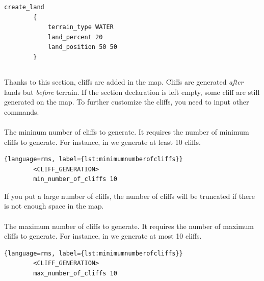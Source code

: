     \begin{lstlisting}[language=rms,label={lst:create-land},caption={Example of usage of \term{create\_land} in Team Arean by vierklee.}]
        create_land
        { 
            terrain_type WATER
            land_percent 20
            land_position 50 50
        }
    \end{lstlisting}

    \subsection{}

    Thanks to this section, cliffs are added in the map\cite{aok:cliffs, zetnus:2015}.
    Cliffs are generated \textit{after} lands but \textit{before} terrain. If the section declaration is left empty, some cliff are still generated on the map.
    To further customize the cliffs, you need to input other commands.

    \paragraph{}

    The mininum number of cliffs to generate. It requires the number of minimum cliffs to generate. For instance, in  we generate at least 10 cliffs.

    \begin{lstlisting}{language=rms, label={lst:minimumnumberofcliffs}}
        <CLIFF_GENERATION>
        min_number_of_cliffs 10
    \end{lstlisting}

    \begin{warning}
        If you put a large number of cliffs, the number of cliffs will be truncated if there is not enough space in the map.
    \end{warning}

    \paragraph{}

    The maximum number of cliffs to generate. It requires the number of maximum cliffs to generate. For instance, in  we generate at most 10 cliffs.

    \begin{lstlisting}{language=rms, label={lst:minimumnumberofcliffs}}
        <CLIFF_GENERATION>
        max_number_of_cliffs 10
    \end{lstlisting}

